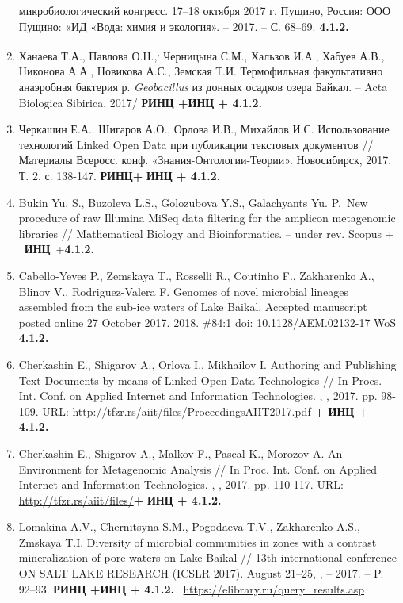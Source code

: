 \documentclass[a4paper,12pt,openany,final]{extreport}
\begin{document}
\begin{enumerate}
  микробиологический конгресс. 17--18 октября 2017 г. Пущино, Россия:
  ООО Пущино: «ИД «Вода: химия и экология». -- 2017. -- С. 68--69.
  \textbf{4.1.2.}
\item
  Ханаева Т.А., Павлова О.Н.,\textsuperscript{,} Черницына С.М., Хальзов
  И.А., Хабуев А.В., Никонова А.А., Новикова А.С., Земская Т.И.
  Термофильная факультативно анаэробная бактерия р. \emph{Geobacillus}
  из донных осадков озера Байкал. -- Acta Biologica Sibirica, 2017/
  \textbf{РИНЦ +ИНЦ + 4.1.2.} ~
\item
  Черкашин Е.А.. Шигаров А.О., Орлова И.В., Михайлов И.С. Использование
  технологий Linked Open Data при публикации текстовых документов //
  Материалы Всеросс. конф. «Знания-Онтологии-Теории». Новосибирск, 2017.
  Т. 2, с. 138-147. \textbf{РИНЦ+} \textbf{ИНЦ + 4.1.2.}
\item
  Bukin Yu. S., Buzoleva L.S., Golozubova Y.S., Galachyants Yu. P.~New
  procedure of raw Illumina MiSeq data filtering for the amplicon
  metagenomic libraries // Mathematical Biology and Bioinformatics. --
  under rev. Scopus + ~\textbf{ИНЦ}~+\textbf{4.1.2.}
\item
  Cabello-Yeves P., Zemskaya T., Rosselli R., Coutinho F., Zakharenko
  A., Blinov V., Rodriguez-Valera F. Genomes of novel microbial lineages
  assembled from the sub-ice waters of Lake Baikal. Accepted manuscript
  posted online 27 October 2017. 2018. \#84:1 doi: 10.1128/AEM.02132-17
  WoS \textbf{4.1.2.}
\item
  Cherkashin E., Shigarov A., Orlova I., Mikhailov I. Authoring and
  Publishing Text Documents by means of Linked Open Data Technologies //
  In Procs. Int. Conf. on Applied Internet and Information Technologies.
  , , 2017. pp. 98-109. URL:
  \url{http://tfzr.rs/aiit/files/ProceedingsAIIT2017.pdf} \textbf{+}
  \textbf{ИНЦ + 4.1.2.}
\item
  Cherkashin E., Shigarov A., Malkov F., Pascal K., Morozov A. An
  Environment for Metagenomic Analysis // In Proc. Int. Conf. on Applied
  Internet and Information Technologies. , , 2017. pp. 110-117. URL:
  \href{http://tfzr.rs/aiit/files/ProceedingsAIIT2017.pdf}{{http://tfzr.rs/aiit/files/}}\textbf{+}
  \textbf{ИНЦ + 4.1.2.}
\item
  Lomakina A.V., Chernitsyna S.M., Pogodaeva T.V., Zakharenko A.S.,
  Zmskaya T.I. Diversity of microbial communities in zones with a
  contrast mineralization of pore waters on Lake Baikal // 13th
  international conference ON SALT LAKE RESEARCH (ICSLR 2017). August
  21--25, , -- 2017. -- P. 92--93. \textbf{РИНЦ +ИНЦ + 4.1.2.}
  ~\href{https://elibrary.ru/query_results.asp}{{https://elibrary.ru/query\_results.asp}}
\end{enumerate}
\end{document}
